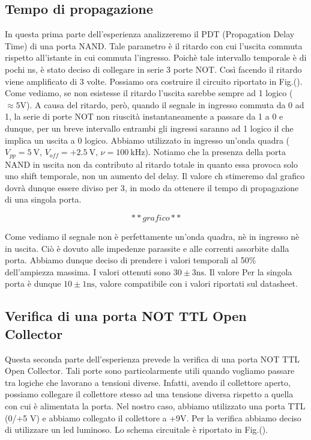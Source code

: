 \subsection*{Tempo di propagazione}
In questa prima parte dell'esperienza analizzeremo il PDT (Propagation Delay Time) di una porta NAND. Tale parametro è il ritardo con cui l'uscita commuta rispetto all'istante in cui commuta l'ingresso. Poichè tale intervallo temporale è di pochi \si{\nano\second}, è stato deciso di collegare in serie 3 porte NOT. Così facendo il ritardo viene amplificato di 3 volte. Possiamo ora costruire il circuito riportato in Fig.(). Come vediamo, se non esistesse il ritardo l'uscita sarebbe sempre ad 1 logico ($\approx 5 \si{\volt}$). A causa del ritardo, però, quando il segnale in ingresso commuta da 0 ad 1, la serie di porte NOT non riuscità instantaneamente a passare da 1 a 0 e dunque, per un breve intervallo entrambi gli ingressi saranno ad 1 logico il che implica un uscita a 0 logico. Abbiamo utilizzato in ingresso un'onda quadra ($V_{pp}=\SI{5}{\volt}$, $V_{off}=+\SI{2.5}{\volt}$, $\nu=\SI{100}{\kilo\hertz}$). Notiamo che la presenza della porta NAND in uscita non da contributo al ritardo totale in quanto essa provoca solo uno shift temporale, non un aumento del delay. Il valore ch stimeremo dal grafico dovrà dunque essere diviso per 3, in modo da ottenere il tempo di propagazione di una singola porta. 

$$**grafico**$$ 


Come vediamo il segnale non è perfettamente un'onda quadra, nè in ingresso nè in uscita. Ciò è dovuto alle impedenze parassite e alle correnti assorbite dalla porta. Abbiamo dunque deciso di prendere i valori temporali al 50\% dell'ampiezza massima. I valori ottenuti sono $30\pm 3 \si{\nano\second}$. Il valore Per la singola porta è dunque $10\pm 1 \si{\nano\second}$, valore compatibile con i valori riportati sul datasheet.


\subsection*{Verifica di una porta NOT TTL Open Collector }

Questa seconda parte dell'esperienza prevede la verifica di una porta NOT TTL Open Collector. Tali porte sono particolarmente utili quando vogliamo passare tra logiche che lavorano a tensioni diverse. Infatti, avendo il collettore aperto, possiamo collegare il collettore stesso ad una tensione diversa rispetto a quella con cui è alimentata la porta. Nel nostro caso, abbiamo utilizzato una porta TTL (0/+5 \si{\volt}) e abbiamo collegato il collettore a +9\si{\volt}. Per la verifica abbiamo deciso di utilizzare un led luminoso. Lo schema circuitale è riportato in Fig.().

